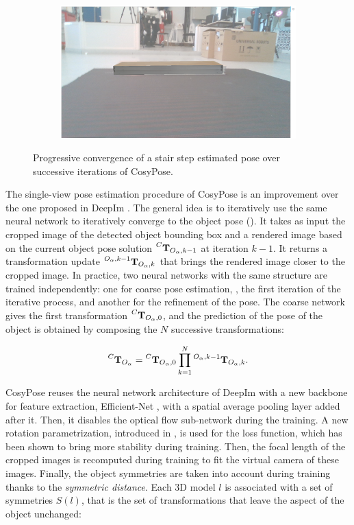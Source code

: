 \begin{figure}[]
    \label{fig:fig}
    \begin{subfigure}{\textwidth}
        \centering
        \includegraphics[width=.45\linewidth]{figures/cosyslam/convergence_3.png}   %
        
    \end{subfigure}
    \caption{\label{fig:cosypose-convergence} Progressive convergence of a stair step estimated pose over successive iterations of CosyPose.}
\end{figure}


The single-view pose estimation procedure of CosyPose is an improvement over the one proposed in DeepIm \cite{deepim_2019}. The general idea is to iteratively 
use the same neural network to iteratively converge to the object pose (). It takes as input the cropped image  of the detected 
object bounding box and a rendered image based on the current object pose solution $\prescript{C}{}{{\bf T}}_{O_{\alpha},k-1}$ at iteration $k-1$. 
It returns a transformation update $\prescript{O_{\alpha},k-1}{}{{\bf T}}_{O_{\alpha},k}$ that brings the rendered image closer to the cropped image. In practice, 
two neural networks with the same structure are trained independently: one for coarse pose estimation, \ie, the first iteration of the iterative process, 
and another for the refinement of the pose. The coarse network gives the first transformation $\prescript{C}{}{{\bf T}}_{O_{\alpha},0}$, 
and the prediction of the pose of the object is obtained by composing the $N$ successive transformations:

\begin{equation}
\prescript{C}{}{{\bf T}}_{O_{\alpha}} = \prescript{C}{}{{\bf T}}_{O_{\alpha},0} \prod_{k=1}^N  \prescript{O_{\alpha},k-1}{}{{\bf T}}_{O_{\alpha},k}.
\end{equation}

CosyPose reuses the neural network architecture of DeepIm with a new backbone for feature extraction, Efficient-Net \cite{tan2020efficientnet} ,
with a spatial average pooling layer added after it. Then, it disables the optical flow sub-network during the training. 
A new rotation parametrization, introduced in \cite{zhou2020continuity}, is used for the loss function, which has been shown 
to bring more stability during training. Then, the focal length of the cropped images is recomputed during training to fit the virtual camera 
of these images. Finally, the object symmetries are taken into account during training thanks to the \textit{symmetric distance}. 
Each 3D model $l$ is associated with a set of symmetries $S(l)$, that is the set of transformations that leave the aspect of the object unchanged:

